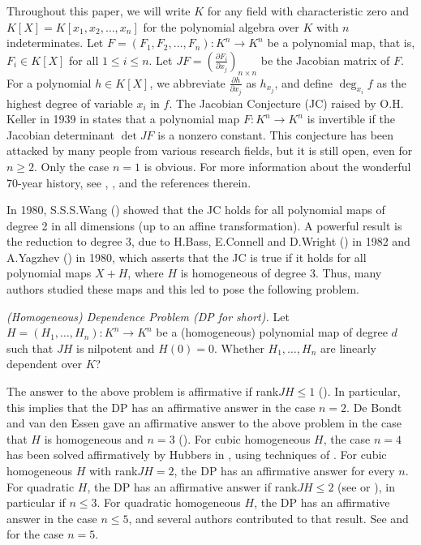 \documentclass[12pt, twoside, leqno]{article}
\theoremstyle{definition}
\numberwithin{equation}{section}
\begin{document}
Throughout this paper, we will write $K$ for any field with
characteristic zero and $K[X]=K[x_1,x_2,\ldots,x_n]$ for the
polynomial algebra over $K$ with $n$ indeterminates. Let
$F=(F_1,F_2,\ldots,F_n):K^n\rightarrow K^n$ be a polynomial map,
that is, $F_i\in K[X]$ for all $1\leq i\leq n$. Let
$JF=(\frac{\partial F_i}{\partial x_j})_{n\times n}$ be the Jacobian
matrix of $F$. For a polynomial $h\in K[X]$, we abbreviate $\frac{\partial h}{\partial x_j}$ as $h_{x_j}$, and define $\deg_{x_i} f$ as the
highest degree of variable $x_i$ in $f$.
The Jacobian Conjecture (JC) raised by O.H. Keller in 1939 in
\cite{1} states that a polynomial map
$F: K^n\rightarrow K^n$ is invertible if the Jacobian
determinant $\det JF$ is a nonzero constant. This conjecture has
been attacked by many people from various research fields, but it is
still open, even for $n\geq 2$. Only the case $n=1$ is obvious. For
more information about the wonderful 70-year history, see \cite{2},
\cite{3}, and the references therein.

In 1980, S.S.S.Wang (\cite{4}) showed that the JC holds for all
polynomial maps of degree 2 in all dimensions (up to an affine
transformation). A powerful result is the reduction to degree
3, due to H.Bass, E.Connell and D.Wright (\cite{2}) in 1982 and
A.Yagzhev (\cite{5}) in 1980, which asserts that the JC is true if
it holds for all polynomial maps $X+H$, where $H$ is homogeneous
of degree 3. Thus, many authors studied these maps and this led to pose the
following problem.

 {\em (Homogeneous) Dependence Problem (DP for short).} Let $H=(H_1,\ldots,H_n): K^n\rightarrow K^n$ be a (homogeneous) polynomial map of degree $d$ such
that $JH$ is nilpotent and $H(0)=0$. Whether $H_1,\ldots,H_n$ are
linearly dependent over $K$?

The answer to the above problem is affirmative if rank$JH\leq 1$
(\cite{2}). In particular, this implies that the DP
has an affirmative answer in the case $n=2$. De Bondt and van den
Essen gave an affirmative answer to the above problem in the case that $H$
is homogeneous and $n=3$ (\cite{8}). For cubic homogeneous $H$, the case $n = 4$ has been solved affirmatively by Hubbers in \cite{7}, using techniques of \cite{6}. For cubic homogeneous $H$ with rank$JH = 2$, the DP has an affirmative answer for every
$n$. For quadratic $H$, the DP has an affirmative answer if
rank$\allowbreak JH \leq 2$ (see \cite{B2} or \cite[Theorem 3.4]{12}), in
particular if $n \leq 3$. For quadratic homogeneous $H$,
the DP has an affirmative answer in the case $n \leq 5$,
and several authors contributed to that result. See \cite[Appendix A]{HKM}
and \cite{XS5} for the case $n = 5$.
\end{document}
